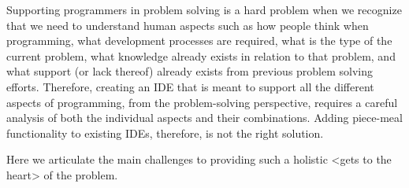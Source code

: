\documentclass{ppig}
\begin{document}
Supporting programmers in problem solving is a hard problem when we recognize that we need to understand human aspects such as how people think when programming, what development processes are required, what is the type of the current problem, what knowledge already exists in relation to that problem, and what support (or lack thereof) already exists from previous problem solving efforts.
Therefore, creating an IDE that is meant to support all the different aspects of programming, from the problem-solving perspective, requires a careful analysis of both the individual aspects and their combinations.
Adding piece-meal functionality to existing IDEs, therefore, is not the right solution.

Here we articulate the main challenges to providing such a holistic <gets to the heart> of the problem.
\end{document}
